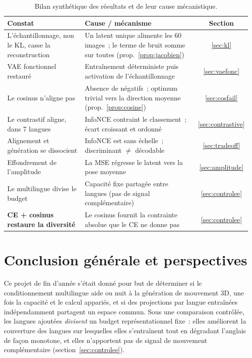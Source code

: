 \documentclass[12pt,a4paper,oneside]{report}
\theoremstyle{definition}
\theoremstyle{plain}
\begin{document}
\begin{table}[ht]
\centering
\caption{Bilan synthétique des résultats et de leur cause mécanistique.}
\label{tab:synthese}
\small
\begin{tabular}{@{}p{4.3cm}p{6.6cm}c@{}}
\toprule
\textbf{Constat} & \textbf{Cause / mécanisme} & \textbf{Section} \\
\midrule
L'échantillonnage, non le KL, casse la reconstruction &
Un latent unique alimente les 60 images~; le terme de bruit somme sur toutes
(prop.~\ref{prop:jacobien}) & \ref{sec:kl} \\
VAE fonctionnel restauré &
Entraînement déterministe puis activation de l'échantillonnage & \ref{sec:vaefonc} \\
Le cosinus n'aligne pas &
Absence de négatifs~; optimum trivial vers la direction moyenne (prop.~\ref{prop:cosine}) & \ref{sec:cosfail} \\
Le contrastif aligne, dans 7 langues &
InfoNCE contraint le classement~; écart croissant et ordonné & \ref{sec:contrastive} \\
Alignement et génération se dissocient &
InfoNCE est sans échelle~; discriminant $\ne$ décodable & \ref{sec:tradeoff} \\
Effondrement de l'amplitude &
La MSE régresse le latent vers la pose moyenne & \ref{sec:amplitude} \\
Le multilingue divise le budget &
Capacité fixe partagée entre langues (pas de signal complémentaire) & \ref{sec:controlee} \\
\textbf{CE + cosinus restaure la diversité} &
Le cosinus fournit la contrainte absolue que le CE ne donne pas & \ref{sec:controlee} \\
\bottomrule
\end{tabular}
\end{table}

\chapter*{Conclusion générale et perspectives}

Ce projet de fin d'année s'était donné pour but de déterminer si le conditionnement
multilingue aide ou nuit à la génération de mouvement 3D, une fois la capacité et
le calcul appariés, et si des projections par langue entraînées indépendamment
partagent un espace commun. Sous une comparaison contrôlée, les langues ajoutées
\emph{divisent} un budget représentationnel fixe~: elles améliorent la couverture
des langues sur lesquelles elles s'entraînent tout en dégradant l'anglais de façon
monotone, et elles n'apportent pas de signal de mouvement complémentaire
(section~\ref{sec:controlee}).
\end{document}
